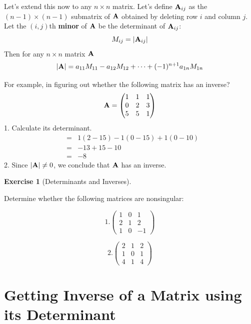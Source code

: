 \documentclass[
]{book}
\theoremstyle{definition}
\theoremstyle{definition}
\theoremstyle{definition}
\newtheorem{exercise}{Exercise}[chapter]
\theoremstyle{definition}
\theoremstyle{remark}
\begin{document}
Let's extend this now to any \(n\times n\) matrix. Let's define \({\bf A}_{ij}\) as the \((n-1)\times (n-1)\) submatrix of \({\bf A}\) obtained by deleting row \(i\) and column \(j\). Let the \((i,j)\)th \textbf{minor} of \({\bf A}\) be the determinant of \({\bf A}_{ij}\):
\[M_{ij}=|{\bf A}_{ij}|\]
Then for any \(n\times n\) matrix \({\bf A}\)
\[|{\bf A}|= a_{11}M_{11} - a_{12}M_{12} + \cdots + (-1)^{n+1} a_{1n} M_{1n}\]

For example, in figuring out whether the following matrix has an inverse?
\[{\bf A}=\begin{pmatrix} 1&1&1\\0&2&3\\5&5&1 \end{pmatrix}\]
1. Calculate its determinant.
\begin{eqnarray}
                &=& 1(2-15) - 1(0-15) + 1(0-10) \nonumber\\
                &=& -13+15-10 \nonumber\\
                &=& -8\nonumber
\end{eqnarray}
2. Since \(|{\bf A}|\ne 0\), we conclude that \({\bf A}\) has an inverse.

\begin{exercise}[Determinants and Inverses]
\protect\hypertarget{exr:determinants}{}{\label{exr:determinants} {} }

Determine whether the following matrices are nonsingular:

\[1. \begin{pmatrix}
            1 & 0 & 1\\
            2 & 1 & 2\\
            1 & 0 & -1
        \end{pmatrix}\]

\[2. \begin{pmatrix}
            2 & 1 & 2\\
            1 & 0 & 1\\
            4 & 1 & 4
        \end{pmatrix}\]
\end{exercise}

\hypertarget{getting-inverse-of-a-matrix-using-its-determinant}{%
\section{Getting Inverse of a Matrix using its Determinant}\label{getting-inverse-of-a-matrix-using-its-determinant}}
\end{document}
